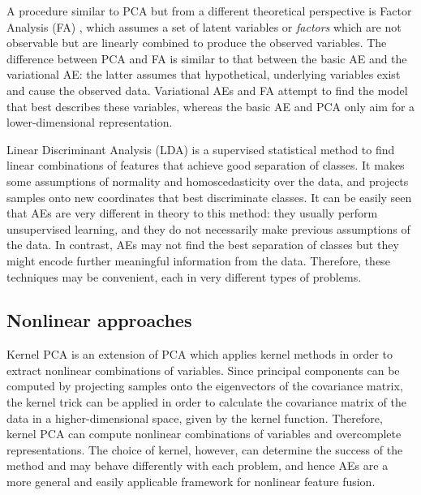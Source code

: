 A procedure similar to PCA but from a different theoretical perspective is Factor Analysis (FA) , which assumes a set of latent variables or \textit{factors} which are not observable but are linearly combined to produce the observed variables. The difference between PCA and FA is similar to that between the basic AE and the variational AE: the latter assumes that hypothetical, underlying variables exist and cause the observed data. Variational AEs and FA attempt to find the model that best describes these variables, whereas the basic AE and PCA only aim for a lower-dimensional representation.

Linear Discriminant Analysis (LDA)  is a supervised statistical method to find linear combinations of features that achieve good separation of classes. It makes some assumptions of normality and homoscedasticity over the data, and projects samples onto new coordinates that best discriminate classes. It can be easily seen that AEs are very different in theory to this method: they usually perform unsupervised learning, and they do not necessarily make previous assumptions of the data. In contrast, AEs may not find the best separation of classes but they might encode further meaningful information from the data. Therefore, these techniques may be convenient, each in very different types of problems.

\subsection{Nonlinear approaches}

Kernel PCA  is an extension of PCA which applies kernel methods in order to extract nonlinear combinations of variables. Since principal components can be computed by projecting samples onto the eigenvectors of the covariance matrix, the kernel trick can be applied in order to calculate the covariance matrix of the data in a higher-dimensional space, given by the kernel function. Therefore, kernel PCA can compute nonlinear combinations of variables and overcomplete representations. The choice of kernel, however, can determine the success of the method and may behave differently with each problem, and hence AEs are a more general and easily applicable framework for nonlinear feature fusion.

